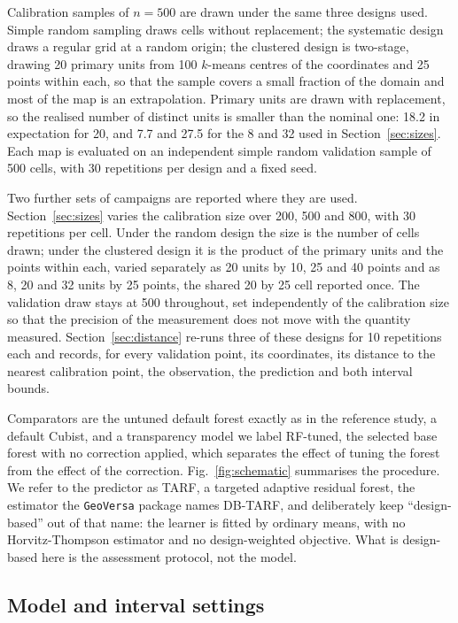 \documentclass[preprint,12pt,authoryear]{elsarticle}
\begin{document}
Calibration samples of $n = 500$ are drawn under the same three designs
\citet{wadoux2021} used. Simple random sampling draws cells without
replacement; the systematic design draws a regular grid at a random origin; the
clustered design is two-stage, drawing 20 primary units from 100 $k$-means
centres of the coordinates and 25 points within each, so that the sample covers
a small fraction of the domain and most of the map is an extrapolation. Primary
units are drawn with replacement, so the realised number of distinct units is
smaller than the nominal one: 18.2 in expectation for 20, and 7.7 and 27.5 for
the 8 and 32 used in Section~\ref{sec:sizes}. Each map is evaluated on an
independent simple random validation sample of 500 cells, with 30 repetitions
per design and a fixed seed.

Two further sets of campaigns are reported where they are used.
Section~\ref{sec:sizes} varies the calibration size over 200, 500 and 800, with
30 repetitions per cell. Under the random design the size is the number of
cells drawn; under the clustered design it is the product of the primary units
and the points within each, varied separately as 20 units by 10, 25 and 40
points and as 8, 20 and 32 units by 25 points, the shared 20 by 25 cell
reported once. The validation draw stays at 500 throughout, set independently of
the calibration size so that the precision of the measurement does not move
with the quantity measured. Section~\ref{sec:distance} re-runs three of these
designs for 10 repetitions each and records, for every validation point, its
coordinates, its distance to the nearest calibration point, the observation,
the prediction and both interval bounds.

Comparators are the untuned default
forest exactly as in the reference study, a default Cubist, and a transparency
model we label RF-tuned, the selected base forest with no correction applied,
which separates the effect of tuning the forest from the effect of the
correction. Fig.~\ref{fig:schematic} summarises the procedure. We refer to the predictor
as TARF, a targeted adaptive residual forest, the estimator the \texttt{GeoVersa}
package names DB-TARF, and deliberately keep
``design-based'' out of that name: the learner is fitted by ordinary means,
with no Horvitz-Thompson estimator and no design-weighted objective. What is
design-based here is the assessment protocol, not the model.

\subsection{Model and interval settings}
\label{sec:settings}
\end{document}

